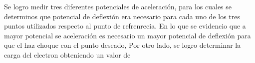 Se logro medir tres diferentes potenciales de aceleración, para los cuales se determinos que potencial de deflexión era 
necesario para cada uno de los tres puntos utilizados respecto al punto de refrenrecia. En lo que se evidencio que a mayor
potencial se aceleración es necesario un mayor potencial de deflexión para que el haz choque con el punto
deseado, Por otro lado, se logro determinar la carga del electron obteniendo un valor de 
